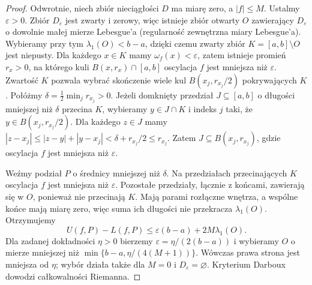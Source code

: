 \begin{proof}
Odwrotnie, niech zbiór nieciągłości $D$ ma miarę
zero, a $|f|\le M$. Ustalmy $\varepsilon>0$.
Zbiór $D_\varepsilon$ jest zwarty i zerowy, więc
istnieje zbiór otwarty $O$ zawierający $D_\varepsilon$
o dowolnie małej mierze Lebesgue'a (regularność zewnętrzna miary Lebesgue'a). Wybieramy przy tym
$\lambda_1(O)<b-a$, dzięki czemu zwarty zbiór
$K=[a,b]\setminus O$ jest niepusty. Dla każdego
$x\in K$ mamy $\omega_f(x)<\varepsilon$,
zatem istnieje promień $r_x>0$, na którego kuli
$B(x,r_x)\cap[a,b]$ oscylacja $f$ jest
mniejsza niż $\varepsilon$. Zwartość $K$ pozwala
wybrać skończenie wiele kul $B(x_j,r_{x_j}/2)$
pokrywających $K$. Połóżmy
$\delta=\frac12\min_j r_{x_j}>0$.
Jeżeli domknięty przedział $J\subseteq[a,b]$
o długości mniejszej niż $\delta$ przecina $K$,
wybieramy $y\in J\cap K$ i indeks $j$ taki, że
$y\in B(x_j,r_{x_j}/2)$. Dla każdego $z\in J$
mamy
$|z-x_j|\le|z-y|+|y-x_j|<\delta+r_{x_j}/2
\le r_{x_j}$.
Zatem $J\subseteq B(x_j,r_{x_j})$, gdzie
oscylacja $f$ jest mniejsza niż $\varepsilon$.

Weźmy podział $P$ o średnicy mniejszej niż $\delta$.
Na przedziałach przecinających $K$ oscylacja $f$
jest mniejsza niż $\varepsilon$. Pozostałe przedziały, łącznie z końcami, zawierają się w $O$, ponieważ nie przecinają $K$. Mają parami rozłączne wnętrza, a wspólne końce mają miarę zero, więc suma ich długości nie przekracza $\lambda_1(O)$. Otrzymujemy
\[
U(f,P)-L(f,P)
\le\varepsilon(b-a)+2M\lambda_1(O).
\]
Dla zadanej dokładności $\eta>0$ bierzemy $\varepsilon=\eta/(2(b-a))$ i wybieramy $O$ o mierze mniejszej niż $\min\{b-a,\eta/(4(M+1))\}$. Wówczas prawa strona jest mniejsza od $\eta$; wybór działa także dla $M=0$ i $D_\varepsilon=\varnothing$. Kryterium Darboux dowodzi
całkowalności Riemanna.
\end{proof}

